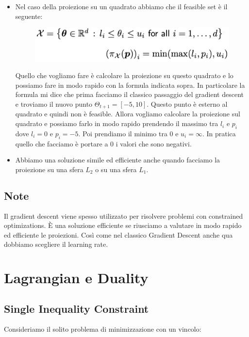 \documentclass[14pt]{extreport}
\begin{document}
\begin{itemize}
	\item Nel caso della proiezione su un quadrato abbiamo che il feasible set è il seguente:\begin{figure}[H]
		      \centering
		      \includegraphics[width=0.7\linewidth]{287.jpeg}
	      \end{figure}
	      Quello che vogliamo fare è calcolare la proiezione su questo quadrato e lo possiamo fare in modo rapido con la formula indicata sopra. In
	      particolare la formula mi dice che prima facciamo il classico passaggio del gradient descent e troviamo il nuovo punto $\Theta_{t+1} = [-5,
	      10]$. Questo punto è esterno al quadrato e quindi non è feasible. Allora vogliamo calcolare la proiezione sul quadrato e possiamo farlo in
	      modo rapido prendendo il massimo tra $l_i$ e $p_i$ dove $l_i = 0$ e $p_i = -5$. Poi prendiamo il minimo tra 0 e $u_i = \infty$. In pratica
	      quello che facciamo è portare a 0 i valori che sono negativi.
	\item Abbiamo una soluzione simile ed efficiente anche quando facciamo la proiezione su una sfera $L_2$ o su una sfera $L_1$.
\end{itemize}

\subsection{Note}

Il gradient descent viene spesso utilizzato per risolvere problemi con constrained optimizations. È una soluzione efficiente se riusciamo a valutare
in modo rapido ed efficiente le proiezioni. Così come nel classico Gradient Descent anche qua dobbiamo scegliere il learning rate.

\section{Lagrangian e Duality}

\subsection{Single Inequality Constraint}

Consideriamo il solito problema di minimizzazione con un vincolo:
\end{document}
